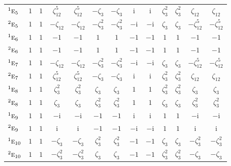 \documentclass[10pt,a4paper]{article}
\numberwithin{equation}{section}
\newcommand{\irr}[1]{\text{\normalfont\scshape #1}}
\newcommand{\conjpair}[1]{{}^{#1}}
\newcommand{\iunit}{\mathrm{i}}
\newcommand{\rootunity}[1]{\zeta_{#1}}
\begin{document}
{\begin{longtable}{@{}lcccccccccccc@{}}
$\conjpair{1}\irr{e}_{5}$ & $1$ & $1$ & $\rootunity{12}^{5}$ & $\rootunity{12}^{5}$ & $-\rootunity{3}$ & $-\rootunity{3}$ & $\iunit{}$ & $\iunit{}$ & $\rootunity{3}^{2}$ & $\rootunity{3}^{2}$ & $\rootunity{12}$ & $\rootunity{12}$\\
$\conjpair{2}\irr{e}_{5}$ & $1$ & $1$ & $-\rootunity{12}$ & $-\rootunity{12}$ & $-\rootunity{3}^{2}$ & $-\rootunity{3}^{2}$ & $-\iunit{}$ & $-\iunit{}$ & $\rootunity{3}$ & $\rootunity{3}$ & $-\rootunity{12}^{5}$ & $-\rootunity{12}^{5}$\\
$\conjpair{1}\irr{e}_{6}$ & $1$ & $1$ & $-1$ & $-1$ & $1$ & $1$ & $-1$ & $-1$ & $1$ & $1$ & $-1$ & $-1$\\
$\conjpair{2}\irr{e}_{6}$ & $1$ & $1$ & $-1$ & $-1$ & $1$ & $1$ & $-1$ & $-1$ & $1$ & $1$ & $-1$ & $-1$\\
$\conjpair{1}\irr{e}_{7}$ & $1$ & $1$ & $-\rootunity{12}$ & $-\rootunity{12}$ & $-\rootunity{3}^{2}$ & $-\rootunity{3}^{2}$ & $-\iunit{}$ & $-\iunit{}$ & $\rootunity{3}$ & $\rootunity{3}$ & $-\rootunity{12}^{5}$ & $-\rootunity{12}^{5}$\\
$\conjpair{2}\irr{e}_{7}$ & $1$ & $1$ & $\rootunity{12}^{5}$ & $\rootunity{12}^{5}$ & $-\rootunity{3}$ & $-\rootunity{3}$ & $\iunit{}$ & $\iunit{}$ & $\rootunity{3}^{2}$ & $\rootunity{3}^{2}$ & $\rootunity{12}$ & $\rootunity{12}$\\
$\conjpair{1}\irr{e}_{8}$ & $1$ & $1$ & $\rootunity{3}^{2}$ & $\rootunity{3}^{2}$ & $\rootunity{3}$ & $\rootunity{3}$ & $1$ & $1$ & $\rootunity{3}^{2}$ & $\rootunity{3}^{2}$ & $\rootunity{3}$ & $\rootunity{3}$\\
$\conjpair{2}\irr{e}_{8}$ & $1$ & $1$ & $\rootunity{3}$ & $\rootunity{3}$ & $\rootunity{3}^{2}$ & $\rootunity{3}^{2}$ & $1$ & $1$ & $\rootunity{3}$ & $\rootunity{3}$ & $\rootunity{3}^{2}$ & $\rootunity{3}^{2}$\\
$\conjpair{1}\irr{e}_{9}$ & $1$ & $1$ & $-\iunit{}$ & $-\iunit{}$ & $-1$ & $-1$ & $\iunit{}$ & $\iunit{}$ & $1$ & $1$ & $-\iunit{}$ & $-\iunit{}$\\
$\conjpair{2}\irr{e}_{9}$ & $1$ & $1$ & $\iunit{}$ & $\iunit{}$ & $-1$ & $-1$ & $-\iunit{}$ & $-\iunit{}$ & $1$ & $1$ & $\iunit{}$ & $\iunit{}$\\
$\conjpair{1}\irr{e}_{10}$ & $1$ & $1$ & $-\rootunity{3}$ & $-\rootunity{3}$ & $\rootunity{3}^{2}$ & $\rootunity{3}^{2}$ & $-1$ & $-1$ & $\rootunity{3}$ & $\rootunity{3}$ & $-\rootunity{3}^{2}$ & $-\rootunity{3}^{2}$\\
$\conjpair{2}\irr{e}_{10}$ & $1$ & $1$ & $-\rootunity{3}^{2}$ & $-\rootunity{3}^{2}$ & $\rootunity{3}$ & $\rootunity{3}$ & $-1$ & $-1$ & $\rootunity{3}^{2}$ & $\rootunity{3}^{2}$ & $-\rootunity{3}$ & $-\rootunity{3}$\\

\end{longtable}}
\end{document}
